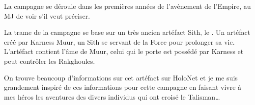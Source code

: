 \documentclass{jdrp}
\begin{document}
	La campagne se déroule dans les premières années de l’avènement de l’Empire, au MJ de voir s’il veut préciser.

	La trame de la campagne se base sur un très ancien artéfact Sith, le . Un artéfact créé par Karness Muur, un Sith se servant de la Force pour prolonger sa vie. L’artéfact contient l’âme de Muur, celui qui le porte est possédé par Karness et peut contrôler les Rakghoules.


	On trouve beaucoup d’informations sur cet artéfact sur HoloNet et je me suis grandement inspiré de ces informations pour cette campagne en faisant vivre à mes héros les aventures des divers individus qui ont croisé le Talisman\ldots

	\twocolumn

	
	
	
	

	\onecolumn
	\nocite{*}
	\printbibliography
\end{document}
